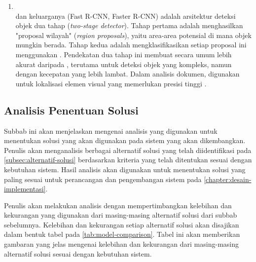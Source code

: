 \begin{enumerate}
    \item \rcnn{} ~\\ \rcnn{} dan keluarganya (Fast R-CNN, Faster R-CNN) adalah arsitektur deteksi objek dua tahap (\textit{two-stage detector}). Tahap pertama adalah menghasilkan "proposal wilayah" (\textit{region proposals}), yaitu area-area potensial di mana objek mungkin berada. Tahap kedua adalah mengklasifikasikan setiap proposal ini menggunakan \cnn. Pendekatan dua tahap ini membuat \rcnn{} secara umum lebih akurat daripada \yolo, terutama untuk deteksi objek yang kompleks, namun dengan kecepatan yang lebih lambat. Dalam analisis dokumen, \rcnn{} digunakan untuk lokalisasi elemen visual yang memerlukan presisi tinggi \parencite{xie2021oriented}.
\end{enumerate}

\subsection{Analisis Penentuan Solusi}
\label{subsec:analisis-penentuan-solusi}

Subbab ini akan menjelaskan mengenai analisis yang digunakan untuk menentukan solusi yang akan digunakan pada sistem yang akan dikembangkan. Penulis akan menganalisis berbagai alternatif solusi yang telah diidentifikasi pada \autoref{subsec:alternatif-solusi} berdasarkan kriteria yang telah ditentukan sesuai dengan kebutuhan sistem. Hasil analisis akan digunakan untuk menentukan solusi yang paling sesuai untuk perancangan dan pengembangan sistem pada \autoref{chapter:desain-implementasi}.

Penulis akan melakukan analisis dengan mempertimbangkan kelebihan dan kekurangan yang digunakan dari masing-masing alternatif solusi dari subbab sebelumnya. Kelebihan dan kekurangan setiap alternatif solusi akan disajikan dalam bentuk tabel pada \autoref{tab:model-comparison}. Tabel ini akan memberikan gambaran yang jelas mengenai kelebihan dan kekurangan dari masing-masing alternatif solusi sesuai dengan kebutuhan sistem.

